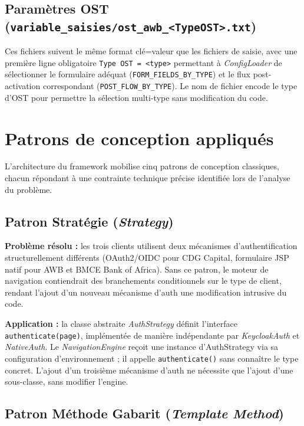 \documentclass[12pt, a4paper]{report}
\begin{document}
\subsection{Paramètres OST (\texttt{variable\_saisies/ost\_awb\_<TypeOST>.txt})}

Ces fichiers suivent le même format clé=valeur que les fichiers de saisie, avec une première ligne obligatoire \texttt{Type OST = <type>} permettant à \textit{ConfigLoader} de sélectionner le formulaire adéquat (\texttt{FORM\_FIELDS\_BY\_TYPE}) et le flux post-activation correspondant (\texttt{POST\_FLOW\_BY\_TYPE}). Le nom de fichier encode le type d'OST pour permettre la sélection multi-type sans modification du code.

\section{Patrons de conception appliqués}
\label{sec:patterns}

L'architecture du framework mobilise cinq patrons de conception classiques, chacun répondant à une contrainte technique précise identifiée lors de l'analyse du problème.

\subsection{Patron Stratégie (\textit{Strategy})}

\textbf{Problème résolu :} les trois clients utilisent deux mécanismes d'authentification structurellement différents (OAuth2/OIDC pour CDG Capital, formulaire JSP natif pour AWB et BMCE Bank of Africa). Sans ce patron, le moteur de navigation contiendrait des branchements conditionnels sur le type de client, rendant l'ajout d'un nouveau mécanisme d'auth une modification intrusive du code.

\textbf{Application :} la classe abstraite \textit{AuthStrategy} définit l'interface \texttt{authenticate(page)}, implémentée de manière indépendante par \textit{KeycloakAuth} et \textit{NativeAuth}. Le \textit{NavigationEngine} reçoit une instance d'AuthStrategy via sa configuration d'environnement ; il appelle \texttt{authenticate()} sans connaître le type concret. L'ajout d'un troisième mécanisme d'auth ne nécessite que l'ajout d'une sous-classe, sans modifier l'engine.

\subsection{Patron Méthode Gabarit (\textit{Template Method})}
\end{document}
